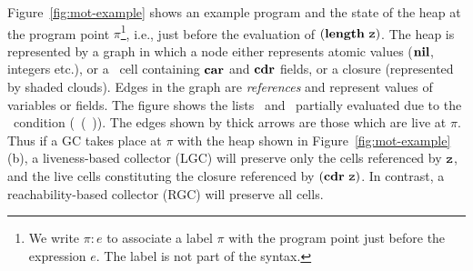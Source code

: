 \documentclass[9pt,preprint,nonatbib]{sigplanconf}
\begin{document}
  Figure~\ref{fig:mot-example}   shows  an   example
program and the state of the heap at the program point $\pi$\footnote{We write
$\pi\!:\!e$ to  associate a  label $\pi$ with  the program  point just
before  the  expression  $e$. The label is not part of the syntax.},  i.e., just  before  the  evaluation  of
$(\mathbf{length}\ \mbox{\tt z})$.  The heap is represented  by a graph in which a node
either  represents  atomic  values   ($\mbox{$\mathbf{ nil}$}$,  integers  etc.),  or  a
\CONS\  cell  containing  $\mbox{$\mathbf{car}$}$  and  $\mbox{$\mathbf{cdr}$}$  fields,  or  a  closure
(represented  by  shaded  clouds).   Edges   in  the  graph  are  {\em
  references} and represent values of variables or fields.  The figure
shows the  lists \px\  and \pz\  partially evaluated  due to  the
\SIF\ condition 
(\NULLQ~(\CAR~\pz)).
The edges  shown by thick  arrows are those  which are live  at $\pi$.
Thus if a GC takes  place at $\pi$ with the heap shown
in Figure~\ref{fig:mot-example}(b),  a liveness-based  collector (LGC)
will preserve only  the cells referenced by $\mbox{\tt z}$, and  the live cells
constituting the  closure referenced by $(\mbox{$\mathbf{cdr}$}~\mbox{\tt z})$.   In contrast, a
reachability-based collector (RGC) will preserve all cells.
\end{document}
